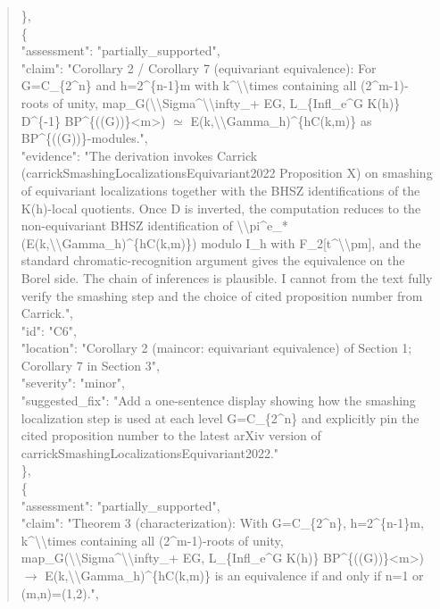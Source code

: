 \documentclass[11pt]{article}
\begin{document}
\begin{quote}
    \},\\
    \{\\
      "assessment": "partially\_supported",\\
      "claim": "Corollary 2 / Corollary 7 (equivariant equivalence): For G=C\_\{2\^{}n\} and h=2\^{}\{n-1\}m with k\^{}\textbackslash{}\textbackslash{}times containing all (2\^{}m-1)-roots of unity, map\_G(\textbackslash{}\textbackslash{}Sigma\^{}\textbackslash{}\textbackslash{}infty\_+ EG, L\_\{Infl\_e\^{}G K(h)\} D\^{}\{-1\} BP\^{}\{((G))\}<m>) \ensuremath{\simeq} E(k,\textbackslash{}\textbackslash{}Gamma\_h)\^{}\{hC(k,m)\} as BP\^{}\{((G))\}-modules.",\\
      "evidence": "The derivation invokes Carrick (carrickSmashingLocalizationsEquivariant2022 Proposition X) on smashing of equivariant localizations together with the BHSZ identifications of the K(h)-local quotients. Once D is inverted, the computation reduces to the non-equivariant BHSZ identification of \textbackslash{}\textbackslash{}pi\^{}e\_*(E(k,\textbackslash{}\textbackslash{}Gamma\_h)\^{}\{hC(k,m)\}) modulo I\_h with F\_2[t\^{}\textbackslash{}\textbackslash{}pm], and the standard chromatic-recognition argument gives the equivalence on the Borel side. The chain of inferences is plausible. I cannot from the text fully verify the smashing step and the choice of cited proposition number from Carrick.",\\
      "id": "C6",\\
      "location": "Corollary 2 (maincor: equivariant equivalence) of Section 1; Corollary 7 in Section 3",\\
      "severity": "minor",\\
      "suggested\_fix": "Add a one-sentence display showing how the smashing localization step is used at each level G=C\_\{2\^{}n\} and explicitly pin the cited proposition number to the latest arXiv version of carrickSmashingLocalizationsEquivariant2022."\\
    \},\\
    \{\\
      "assessment": "partially\_supported",\\
      "claim": "Theorem 3 (characterization): With G=C\_\{2\^{}n\}, h=2\^{}\{n-1\}m, k\^{}\textbackslash{}\textbackslash{}times containing all (2\^{}m-1)-roots of unity, map\_G(\textbackslash{}\textbackslash{}Sigma\^{}\textbackslash{}\textbackslash{}infty\_+ EG, L\_\{Infl\_e\^{}G K(h)\} BP\^{}\{((G))\}<m>) \ensuremath{\to} E(k,\textbackslash{}\textbackslash{}Gamma\_h)\^{}\{hC(k,m)\} is an equivalence if and only if n=1 or (m,n)=(1,2).",\\

\end{quote}
\end{document}
